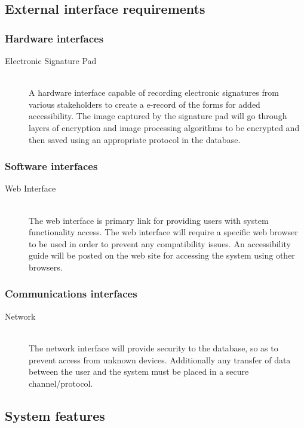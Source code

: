 \documentclass{journal}
\begin{document}
        \subsection{External interface requirements}
                \subsubsection{Hardware interfaces}

\begin{description}
\item[Electronic Signature Pad]\hfill \\
A hardware interface capable of recording electronic signatures from various stakeholders to create a e-record of the forms for added accessibility. The image captured by the signature pad will go through layers of encryption and image processing algorithms to be encrypted and then saved using an appropriate protocol in the database. 
\end{description}
        
                \subsubsection{Software interfaces}
\begin{description}
\item[Web Interface]\hfill \\
The web interface is primary link for providing users with system functionality access. The web interface will require a specific web browser to be used in order to prevent any compatibility issues. An accessibility guide will be posted on the web site for accessing the system using other browsers. 
\end{description}

                \subsubsection{Communications interfaces}
\begin{description}
\item[Network]\hfill \\
The network interface will provide security to the database, so as to prevent access from unknown devices. Additionally any transfer of data between the user and the system must be placed in a secure channel/protocol.  
\end{description}


\subsection{System features}
\end{document}
